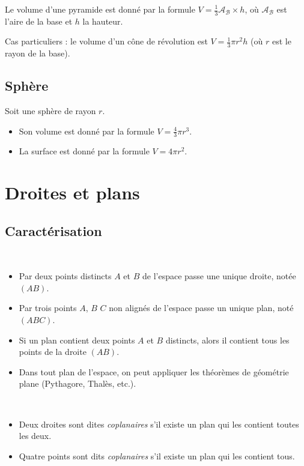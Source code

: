 \begin{propriete}
  Le volume d'une pyramide est donné par la formule $V=\frac{1}{3}\mathcal{A_B}\times h$, où $\mathcal{A_B}$ est l'aire de la base et $h$ la hauteur.

  Cas particuliers : le volume d'un cône de révolution est $V=\frac{1}{3}\pi r^2h$ (où $r$ est le rayon de la base).
\end{propriete}

\subsection{Sphère}

\begin{propriete}Soit une sphère de rayon $r$.
  \begin{itemize}
    \item Son volume est donné par la formule $V=\frac{4}{3}\pi r^3$.
    \item La surface est donné par la formule $V=4\pi r^2$.
  \end{itemize}
\end{propriete}

\section{Droites et plans}

\subsection{Caractérisation}

\begin{propriete}~
  \begin{itemize}
    \item Par deux points distincts $A$ et $B$ de l'espace passe une unique droite, notée $(AB)$.
    \item Par trois points $A$, $B$ $C$ non alignés de l'espace passe un unique plan, noté $(ABC)$.
    \item Si un plan contient deux points $A$ et $B$ distincts, alors il contient tous les points de la droite $(AB)$.
    \item Dans tout plan de l'espace, on peut appliquer les théorèmes de géométrie plane (Pythagore, Thalès, etc.).
  \end{itemize}
\end{propriete}

\begin{definition}~
  \begin{itemize}
    \item Deux droites sont dites \emph{coplanaires} s'il existe un plan qui les contient toutes les deux.
    \item Quatre points sont dits \emph{coplanaires} s'il existe un plan qui les contient tous.
  \end{itemize}
\end{definition}

